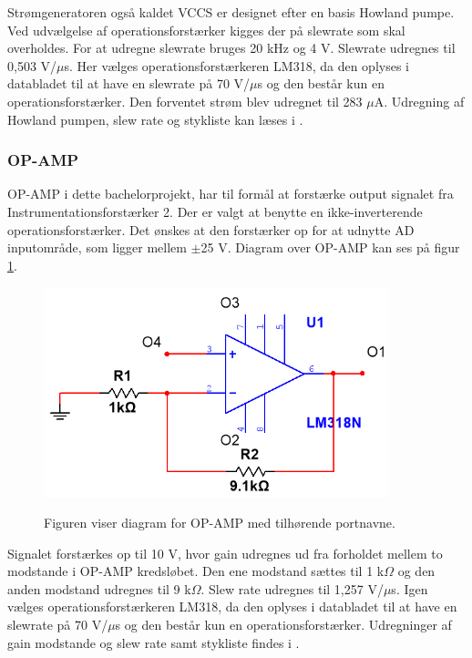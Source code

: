 Strømgeneratoren også kaldet VCCS er designet efter en basis Howland pumpe. Ved udvælgelse af operationsforstærker kigges der på slewrate som skal overholdes. For at udregne slewrate bruges 20 kHz og 4 V. Slewrate udregnes til 0,503 V/$\mu$s. Her vælges operationsforstærkeren LM318, da den oplyses i databladet til at have en slewrate på 70 V/$\mu$s og den består kun en operationsforstærker. Den forventet strøm blev udregnet til 283 $\mu$A. Udregning af Howland pumpen, slew rate og stykliste kan læses i .


\subsubsection{OP-AMP}
OP-AMP i dette bachelorprojekt, har til formål at forstærke output signalet fra Instrumentationsforstærker 2. Der er valgt at benytte en ikke-inverterende operationsforstærker. Det ønskes at den forstærker op for at udnytte AD inputområde, som ligger mellem $\pm$25 V. Diagram over OP-AMP kan ses på figur \ref{fig:IkkeInviterendeOpAmp}.



\begin{figure}[H]
\centering
{\includegraphics[width=10cm]
{Figure/IkkeInviterendeOpAmp}}
\caption{Figuren viser diagram for OP-AMP med tilhørende portnavne.}
\label{fig:IkkeInviterendeOpAmp}
\end{figure}

Signalet forstærkes op til 10 V, hvor gain udregnes ud fra forholdet mellem to modstande i OP-AMP kredsløbet. Den ene modstand sættes til 1 k$\Omega$ og den anden modstand udregnes til 9 k$\Omega$. Slew rate udregnes til 1,257 V/$\mu$s. Igen vælges operationsforstærkeren LM318, da den oplyses i databladet til at have en slewrate på 70 V/$\mu$s og den består kun en operationsforstærker. Udregninger af gain modstande og slew rate samt stykliste findes i .


